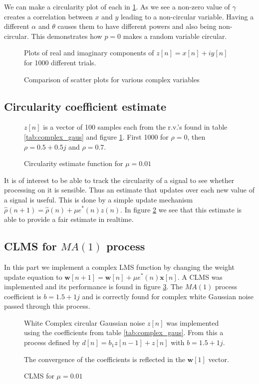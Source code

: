 \documentclass[10pt,twoside,a4paper]{report}
\begin{document}
We can make a circularity plot of each in \ref{fig:4_2b}. As we see a non-zero value of $\gamma$ creates a correlation between $x$ and $y$ leading to a non-circular variable. Having a different $\alpha$ and $\theta$ causes them to have different powers and also being non-circular. This demonstrates how $p=0$ makes a random variable circular.

\begin{figure}[h]
\centering
\resizebox{\textwidth}{!}{}
Plots of real and imaginary components of $z[n]=x[n]+iy[n]$ for 1000 different trials.
\caption{Comparison of scatter plots for various complex variables}
\label{fig:4_2b}
\end{figure}

\subsection{Circularity coefficient estimate}
\FloatBarrier
\begin{figure}[h]
\centering
\resizebox{\textwidth}{!}{}
$z[n]$ is a vector of 100 samples each from the r.v.'s found in table \ref{tab:complex_gaus} and figure \ref{fig:4_2b}. First 1000 for $\rho=0$, then $\rho=0.5+0.5j$ and $\rho=0.7$.
\caption{Circularity estimate function for $\mu=0.01$}
\label{fig:4_2c}
\end{figure}

It is of interest to be able to track the circularity of a signal to see whether processing on it is sensible. Thus an estimate that updates over each new value of a signal is useful. This is done by a simple update mechanism $\hat{\rho}(n+1)=\hat{\rho}(n) + \mu e^*(n)z(n)$. In figure \ref{fig:4_2c} we see that this estimate is able to provide a fair estimate in realtime.
\FloatBarrier
\subsection{CLMS for $MA(1)$ process}

In this part we implement a complex LMS function by changing the weight update equation to $\mathbf{w}[n+1] =   \mathbf{w}[n] + \mu e^*(n)\mathbf{x}[n]$. A CLMS was implemented and its performance is found in figure \ref{fig:4_2d}. The $MA(1)$ process coefficient is $b=1.5+1j$ and is correctly found for complex white Gaussian noise passed through this process.

\begin{figure}[h]
\centering
\resizebox{\textwidth}{!}{}
White Complex circular Gaussian noise $z[n]$ was implemented using the coefficients from table \ref{tab:complex_gaus}. From this a process defined by $d[n] = b_1z[n-1] + z[n]$ with $b=1.5+1j$.

The convergence of the coefficients is reflected in the $\mathbf{w}[1]$ vector.
\caption{CLMS for $\mu=0.01$}
\label{fig:4_2d}
\end{figure}
\end{document}
